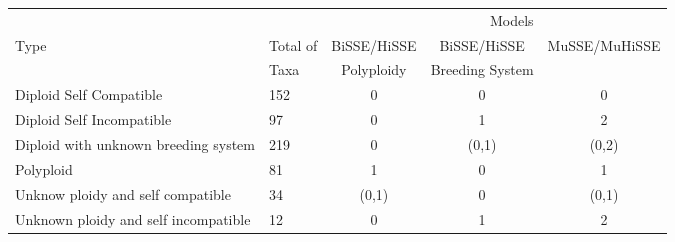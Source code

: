 \noindent \begin{tabular}{@{}llccc@{}} \toprule %
\multicolumn{4}{r}{Models} \\ \cmidrule(r){3-5}
Type & Total of & BiSSE/HiSSE & BiSSE/HiSSE & MuSSE/MuHiSSE\\ 
 &Taxa &  Polyploidy & Breeding System &  \\ \midrule
Diploid Self Compatible & 152 & 0 &  0 & 0 \\
Diploid Self Incompatible& 97 & 0  & 1 & 2\\
Diploid with unknown breeding system & 219 & 0 & (0,1) & (0,2) \\
Polyploid & 81 & 1& 0 & 1 \\
Unknow ploidy and self compatible& 34 & (0,1)& 0 & (0,1) \\ 
Unknown ploidy and self incompatible & 12 & 0 & 1 & 2 \\ \bottomrule
\end{tabular}

